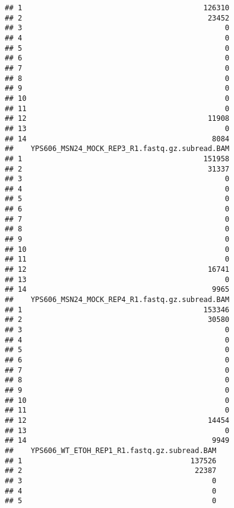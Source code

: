 \documentclass[
]{book}
\begin{document}
\begin{verbatim}
## 1                                          126310
## 2                                           23452
## 3                                               0
## 4                                               0
## 5                                               0
## 6                                               0
## 7                                               0
## 8                                               0
## 9                                               0
## 10                                              0
## 11                                              0
## 12                                          11908
## 13                                              0
## 14                                           8084
##    YPS606_MSN24_MOCK_REP3_R1.fastq.gz.subread.BAM
## 1                                          151958
## 2                                           31337
## 3                                               0
## 4                                               0
## 5                                               0
## 6                                               0
## 7                                               0
## 8                                               0
## 9                                               0
## 10                                              0
## 11                                              0
## 12                                          16741
## 13                                              0
## 14                                           9965
##    YPS606_MSN24_MOCK_REP4_R1.fastq.gz.subread.BAM
## 1                                          153346
## 2                                           30580
## 3                                               0
## 4                                               0
## 5                                               0
## 6                                               0
## 7                                               0
## 8                                               0
## 9                                               0
## 10                                              0
## 11                                              0
## 12                                          14454
## 13                                              0
## 14                                           9949
##    YPS606_WT_ETOH_REP1_R1.fastq.gz.subread.BAM
## 1                                       137526
## 2                                        22387
## 3                                            0
## 4                                            0
## 5                                            0

\end{verbatim}
\end{document}

